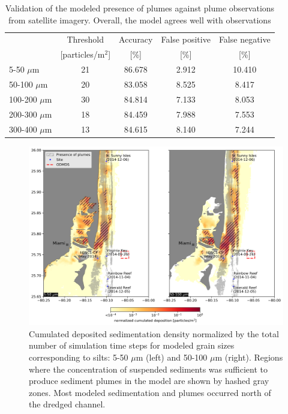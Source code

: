 \documentclass[preprint,12pt,authoryear]{elsarticle}
\begin{document}
\begin{table}
    \centering
    \begin{tabular}{|l|cccc|}
        \hline
         & Threshold         & Accuracy & False positive  & False negative \\
         & [particles/m$^2$] & [\%]     & [\%]            & [\%]  \\
        \hline
        5-50 $\mu$m    & 21 & 86.678 & 2.912 & 10.410 \\
        50-100 $\mu$m  & 20 & 83.058 & 8.525 & 8.417 \\
        100-200 $\mu$m & 30 & 84.814 & 7.133 & 8.053 \\
        200-300 $\mu$m & 18 & 84.459 & 7.988 & 7.553 \\
        300-400 $\mu$m & 13 & 84.615 & 8.140 & 7.244 \\
        \hline
    \end{tabular}
    \caption{Validation of the modeled presence of plumes against plume observations from satellite imagery. Overall, the model agrees well with observations}
    \label{tab:onset_val} 
\end{table}

\begin{figure}
    \centering
    \includegraphics[width=\textwidth]{figures/deposition_plumes.png}
    \caption{Cumulated deposited sedimentation density normalized by the total number of simulation time steps for modeled grain sizes corresponding to silts: 5-50 $\mu$m (left)
    and 50-100 $\mu$m (right). Regions where the concentration of suspended sediments was sufficient to produce sediment plumes in the model are shown by hashed gray zones. Most modeled sedimentation and plumes occurred north of the dredged channel.}
    \label{fig:onset_depo}    
\end{figure}
\end{document}
